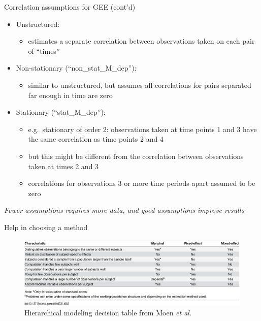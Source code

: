 \documentclass[
  ignorenonframetext,
]{beamer}
\providecommand{\tightlist}{%
  \setlength{\itemsep}{0pt}\setlength{\parskip}{0pt}}
\begin{document}
\begin{frame}{Correlation assumptions for GEE (cont'd)}
\protect\hypertarget{correlation-assumptions-for-gee-contd}{}

\begin{itemize}
\tightlist
\item
  Unstructured:

  \begin{itemize}
  \tightlist
  \item
    estimates a separate correlation between observations taken on each
    pair of ``times''
  \end{itemize}
\item
  Non-stationary (``non\_stat\_M\_dep''):

  \begin{itemize}
  \tightlist
  \item
    similar to unstructured, but assumes all correlations for pairs
    separated far enough in time are zero
  \end{itemize}
\item
  Stationary (``stat\_M\_dep''):

  \begin{itemize}
  \tightlist
  \item
    e.g.~stationary of order 2: observations taken at time points 1 and
    3 have the same correlation as time points 2 and 4
  \item
    but this might be different from the correlation between
    observations taken at times 2 and 3
  \item
    correlations for observations 3 or more time periods apart assumed
    to be zero
  \end{itemize}
\end{itemize}

\emph{Fewer assumptions requires more data, and good assumptions improve
results}

\end{frame}

\begin{frame}{Help in choosing a method}
\protect\hypertarget{help-in-choosing-a-method}{}

\begin{figure}
\centering
\includegraphics{journal.pone.0146721.t002.PNG}
\caption{Hierarchical modeling decision table from Moen \emph{et al.}}
\end{figure}

\end{frame}
\end{document}
